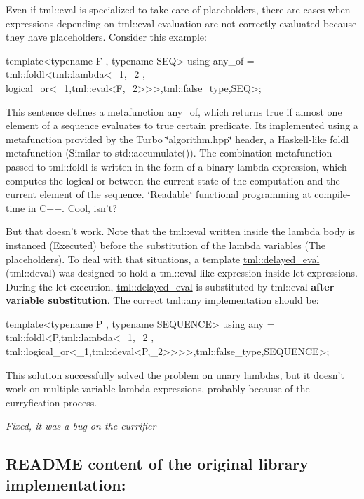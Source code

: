 \begin{DoxyItemize}
Even if {\ttfamily tml\+::eval} is specialized to take care of placeholders, there are cases when expressions depending on {\ttfamily tml\+::eval} evaluation are not correctly evaluated because they have placeholders. Consider this example\+: \begin{DoxyVerb} template<typename F , typename SEQ>
 using any_of = tml::foldl<tml::lambda<_1,_2 , logical_or<_1,tml::eval<F,_2>>>,tml::false_type,SEQ>;
\end{DoxyVerb}


This sentence defines a metafunction {\ttfamily any\+\_\+of}, which returns true if almost one element of a sequence evaluates to true certain predicate. Its implemented using a metafunction provided by the Turbo \char`\"{}algorithm.\+hpp\char`\"{} header, a Haskell-\/like {\ttfamily foldl} metafunction (Similar to {\ttfamily std\+::accumulate()}). The combination metafunction passed to {\ttfamily tml\+::foldl} is written in the form of a binary lambda expression, which computes the logical or between the current state of the computation and the current element of the sequence. \char`\"{}\+Readable\char`\"{} functional programming at compile-\/time in C++. Cool, isn't?

But that doesn't work. Note that the {\ttfamily tml\+::eval} written inside the lambda body is instanced (Executed) before the substitution of the lambda variables (The placeholders). To deal with that situations, a template {\ttfamily \hyperlink{structtml_1_1delayed__eval}{tml\+::delayed\+\_\+eval}} ({\ttfamily tml\+::deval}) was designed to hold a {\ttfamily tml\+::eval}-\/like expression inside let expressions. During the let execution, {\ttfamily \hyperlink{structtml_1_1delayed__eval}{tml\+::delayed\+\_\+eval}} is substituted by {\ttfamily tml\+::eval} {\bfseries after variable substitution}. The correct {\ttfamily tml\+::any} implementation should be\+: \begin{DoxyVerb}  template<typename P , typename SEQUENCE>
  using any = tml::foldl<P,tml::lambda<_1,_2 , tml::logical_or<_1,tml::deval<P,_2>>>>,tml::false_type,SEQUENCE>;
\end{DoxyVerb}


This solution successfully solved the problem on unary lambdas, but it doesn't work on multiple-\/variable lambda expressions, probably because of the curryfication process.

{\itshape Fixed, it was a bug on the currifier}
\end{DoxyItemize}

\subsection*{R\+E\+A\+D\+M\+E content of the original library implementation\+:}

